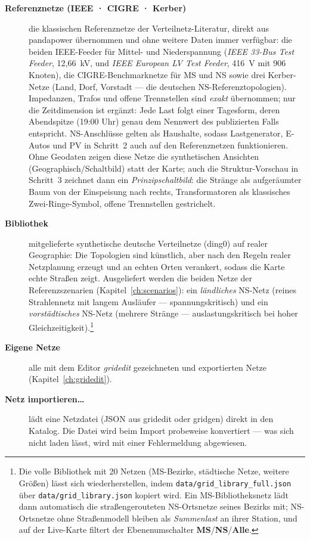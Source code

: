 \documentclass[11pt,a4paper,parskip=half]{scrreprt}
\newcommand{\ui}[1]{\textsf{\bfseries #1}}          %
\begin{document}
\begin{description}
  \item[\ui{Referenznetze (IEEE · CIGRE · Kerber)}] die klassischen
    Referenznetze der Verteilnetz-Literatur, direkt aus pandapower
    übernommen und ohne weitere Daten immer verfügbar: die beiden
    IEEE-Feeder für Mittel- und Niederspannung (\emph{IEEE 33-Bus
    Test Feeder}, 12,66~kV, und \emph{IEEE European LV Test Feeder},
    416~V mit 906 Knoten), die CIGRE-Benchmarknetze für MS und NS
    sowie drei Kerber-Netze (Land, Dorf, Vorstadt --- die deutschen
    NS-Referenztopologien). Impedanzen, Trafos und offene
    Trennstellen sind \emph{exakt} übernommen; nur die Zeitdimension
    ist ergänzt: Jede Last folgt einer Tagesform, deren Abendspitze
    (19:00 Uhr) genau dem Nennwert des publizierten Falls
    entspricht. NS-Anschlüsse gelten als Haushalte, sodass
    Lastgenerator, E-Autos und PV in Schritt~2 auch auf den
    Referenznetzen funktionieren. Ohne Geodaten zeigen diese Netze
    die synthetischen Ansichten (Geographisch/Schaltbild) statt der
    Karte; auch die Struktur-Vorschau in Schritt~3 zeichnet dann ein
    \emph{Prinzipschaltbild}: die Stränge als aufgeräumter Baum von
    der Einspeisung nach rechts, Transformatoren als klassisches
    Zwei-Ringe-Symbol, offene Trennstellen gestrichelt.
  \item[\ui{Bibliothek}] mitgelieferte synthetische deutsche
    Verteilnetze (ding0) auf realer Geographie: Die Topologien
    sind künstlich, aber nach den Regeln realer Netzplanung
    erzeugt und an echten Orten verankert, sodass die Karte echte
    Straßen zeigt. Ausgeliefert werden die beiden Netze der
    Referenzszenarien (Kapitel~\ref{ch:scenarios}): ein
    \emph{ländliches} NS-Netz (reines Strahlennetz mit langem
    Ausläufer --- spannungskritisch) und ein \emph{vorstädtisches}
    NS-Netz (mehrere Stränge --- auslastungskritisch bei hoher
    Gleichzeitigkeit).\footnote{Die volle Bibliothek mit 20 Netzen
    (MS-Bezirke, städtische Netze, weitere Größen) lässt sich
    wiederherstellen, indem \texttt{data/grid\_library\_full.json}
    über \texttt{data/grid\_library.json} kopiert wird. Ein
    MS-Bibliotheksnetz lädt dann automatisch die straßengerouteten
    NS-Ortsnetze seines Bezirks mit; NS-Ortsnetze ohne Straßenmodell
    bleiben als \emph{Summenlast} an ihrer Station, und auf der
    Live-Karte filtert der Ebenenumschalter \ui{MS}/\ui{NS}/\ui{Alle}.}
  \item[\ui{Eigene Netze}] alle mit dem Editor \emph{gridedit}
    gezeichneten und exportierten Netze
    (Kapitel~\ref{ch:gridedit}).
  \item[\ui{Netz importieren…}] lädt eine Netzdatei (JSON aus
    gridedit oder gridgen) direkt in den Katalog. Die Datei wird
    beim Import probeweise konvertiert --- was sich nicht laden
    lässt, wird mit einer Fehlermeldung abgewiesen.
\end{description}
\end{document}
